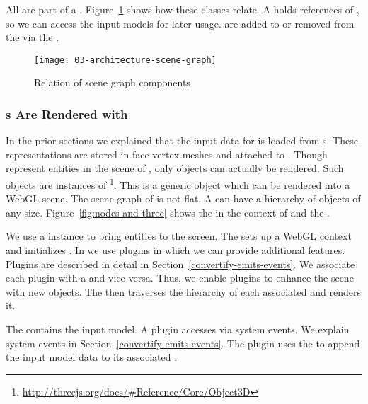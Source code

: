 \documentclass[../../ClassicThesis.tex]{subfiles}
\begin{document}
All  are part of a .
Figure~\ref{fig:scene-graph} shows how these classes relate.
A  holds references of , so we can
access the input models for later usage.  are
added to or removed from the  via the
.

\begin{figure}[h]
  \centering
  \texttt{[image: 03-architecture-scene-graph]}
  \caption{Relation of scene graph components}
  \label{fig:scene-graph}
\end{figure}

\subsubsection{{\threedobject}s Are Rendered with
  {\threejs}}

In the prior sections we explained that the input data for
{\convertify} is loaded from {\stlfile}s. These
{\threedmodel} representations are stored in face-vertex
meshes and attached to .
Though  represent entities in the scene of
{\convertify}, only {\threejs} objects can actually be
rendered. Such {\threejs} objects are instances of
\footnote{\url{http://threejs.org/docs/\#Reference/Core/Object3D}}.
This is a generic object which can be rendered into a WebGL
scene.
The scene graph of {\threejs} is not flat. A
 can have a hierarchy of objects of
any size. Figure~\ref{fig:nodes-and-three} shows the
 in the context of  and
the .

We use a  instance to bring {\threejs}
entities to the screen. The  sets up a WebGL
context and initializes {\threejs}. In {\convertify} we use
plugins in which we can provide additional features. Plugins
are described in detail in
Section~\ref{convertify-emits-events}. We associate each
plugin with a  and vice-versa. Thus,
we enable plugins to enhance the scene with new objects. The
 then traverses the hierarchy of each
associated  and renders it.

The  contains the input model. A plugin accesses
 via system events. We explain system events in
Section~\ref{convertify-emits-events}. The plugin uses the
 to append the input model data to its
associated .
\end{document}
